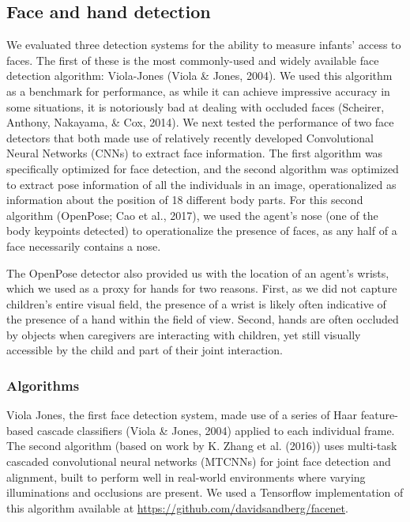 \documentclass[english,man]{apa6}
\begin{document}
\subsection{Face and hand detection}\label{face-and-hand-detection}

We evaluated three detection systems for the ability to measure infants'
access to faces. The first of these is the most commonly-used and widely
available face detection algorithm: Viola-Jones (Viola \& Jones, 2004).
We used this algorithm as a benchmark for performance, as while it can
achieve impressive accuracy in some situations, it is notoriously bad at
dealing with occluded faces (Scheirer, Anthony, Nakayama, \& Cox, 2014).
We next tested the performance of two face detectors that both made use
of relatively recently developed Convolutional Neural Networks (CNNs) to
extract face information. The first algorithm was specifically optimized
for face detection, and the second algorithm was optimized to extract
pose information of all the individuals in an image, operationalized as
information about the position of 18 different body parts. For this
second algorithm (OpenPose; Cao et al., 2017), we used the agent's nose
(one of the body keypoints detected) to operationalize the presence of
faces, as any half of a face necessarily contains a nose.

The OpenPose detector also provided us with the location of an agent's
wrists, which we used as a proxy for hands for two reasons. First, as we
did not capture children's entire visual field, the presence of a wrist
is likely often indicative of the presence of a hand within the field of
view. Second, hands are often occluded by objects when caregivers are
interacting with children, yet still visually accessible by the child
and part of their joint interaction.

\subsubsection{Algorithms}\label{algorithms}

Viola Jones, the first face detection system, made use of a series of
Haar feature-based cascade classifiers (Viola \& Jones, 2004) applied to
each individual frame. The second algorithm (based on work by K. Zhang
et al. (2016)) uses multi-task cascaded convolutional neural networks
(MTCNNs) for joint face detection and alignment, built to perform well
in real-world environments where varying illuminations and occlusions
are present. We used a Tensorflow implementation of this algorithm
available at \url{https://github.com/davidsandberg/facenet}.
\end{document}
